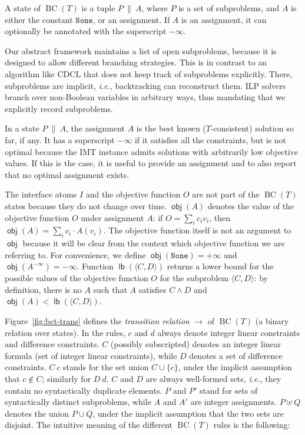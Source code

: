 \documentclass{llncs}
\newcommand{\comment}[1]{}
\newcommand{\ie}[0]{\emph{i.e.}, }
\newcommand\none[0]{\ensuremath{\mathtt{None}}}
\newcommand{\state}[2]{\ensuremath{#1\ \|\ #2}}
\newcommand{\subp}[2]{\ensuremath{\langle#1, #2\rangle}}
\newcommand{\Z}[0]{\ensuremath{\mathcal{Z}}}
\newcommand{\cd}{\subp{C}{D}}
\newcommand{\pa}{\state{P}{A}}
\newcommand{\bct}[0]{\ensuremath{\operatorname{BC}(T)}}
\newcommand{\obj}[1]{\ensuremath{\operatorname{\mathsf{obj}}(#1)}}
\newcommand{\lb}[1]{\ensuremath{\operatorname{\mathsf{lb}}(#1)}}
\begin{document}
\begin{definition}[State]
  A state of \bct{} is a tuple {\pa}, where $P$ is a set of
  subproblems, and $A$ is either the constant \none, or an assignment.
  If $A$ is an assignment, it can optionally be annotated with the
  superscript $-\infty$.
\end{definition}

Our abstract framework maintains a list of open subproblems, because
it is designed to allow different branching strategies. This is in
contrast to an algorithm like CDCL that does not keep track of
subproblems explicitly. There, subproblems are implicit, \ie
backtracking can reconstruct them. ILP solvers branch over non-Boolean
variables in arbitrary ways, thus mandating that we explicitly record
subproblems.

In a state \pa{}, the assignment $A$ is the best known
($T$-consistent) solution so far, if any. It has a superscript
$-\infty$ if it satisfies all the constraints, but is not optimal
because the IMT instance admits solutions with arbitrarily low
objective values. If this is the case, it is useful to provide an
assignment and to also report that no optimal assignment exists.

The interface atoms $I$ and the objective function $O$ are not part of
the \bct{} states because they do not change over time.  $\obj{A}$
denotes the value of the objective function $O$ under assignment $A$:
if $O = \sum_i c_i v_i$, then $\obj{A} = \sum_i c_i \cdot A(v_i)$. The
objective function itself is not an argument to
$\operatorname{\mathsf{obj}}$ because it will be clear from the
context which objective function we are referring to. For convenience,
we define $\obj{\none} = +\infty$ and $\obj{A^{ -\infty}} =
-\infty$. Function $\lb{\cd}$ returns a lower bound for the possible
values of the objective function $O$ for the subproblem \cd{}: by
definition, there is no $A$ such that $A$ satisfies $C \wedge D$ and
$\obj{A} < \lb{\cd}$.

Figure~\ref{fig:bct-trans} defines the \emph{transition relation}
$\longrightarrow$ of \bct{} (a binary relation over states). In the
rules, $c$ and $d$ always denote integer linear constraints and
difference constraints. $C$ (possibly subscripted) denotes an integer
linear formula (set of integer linear constraints), while $D$ denotes
a set of difference constraints. $C\ c$ stands for the set union $C
\cup \{c\}$, under the implicit assumption that $c \notin C$;
similarly for $D\ d$. $C$ and $D$ are always well-formed sets, \ie
they contain no syntactically duplicate elements. $P$ and $P'$ stand
for sets of syntactically distinct subproblems, while $A$ and $A'$ are
integer assignments.  $P \uplus Q$ denotes the union $P \cup Q$, under
the implicit assumption that the two sets are disjoint. \comment{$F$
  stands for a $(\Sigma \cup \Sigma_\Z)$-formula, where $\Sigma$ is
  the signature of $T$.} The intuitive meaning of the different \bct{}
rules is the following:
\end{document}
